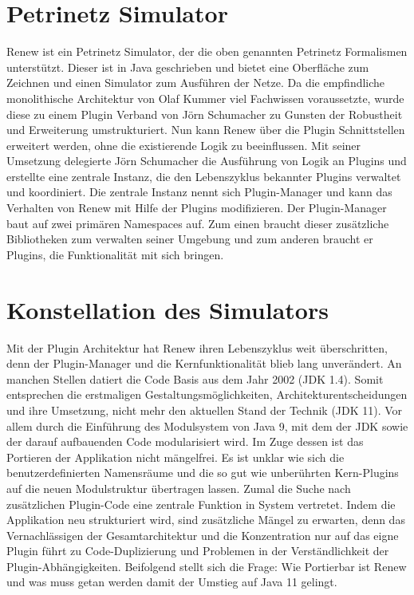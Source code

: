 \section{Petrinetz Simulator} 
Renew ist ein Petrinetz Simulator, der die oben genannten Petrinetz Formalismen unterstützt. 
Dieser ist in Java geschrieben und bietet eine Oberfläche zum Zeichnen und einen Simulator zum Ausführen der Netze.\newline 
Da die empfindliche monolithische Architektur von Olaf Kummer viel Fachwissen voraussetzte, wurde diese zu einem Plugin Verband von Jörn Schumacher zu Gunsten der Robustheit und Erweiterung umstrukturiert. 
Nun kann Renew über die Plugin Schnittstellen erweitert werden, ohne die existierende Logik zu beeinflussen.\bigbreak
Mit seiner Umsetzung delegierte Jörn Schumacher die Ausführung von Logik an Plugins und erstellte eine zentrale Instanz, die den Lebenszyklus bekannter Plugins verwaltet und koordiniert. 
Die zentrale Instanz nennt sich Plugin-Manager und kann das Verhalten von Renew mit Hilfe der Plugins modifizieren.
Der Plugin-Manager baut auf zwei primären Namespaces auf. 
Zum einen braucht dieser zusätzliche Bibliotheken zum verwalten seiner Umgebung und zum anderen braucht er Plugins, die Funktionalität mit sich bringen.

\section{Konstellation des Simulators}
Mit der Plugin Architektur hat Renew ihren Lebenszyklus weit überschritten, denn der Plugin-Manager und die Kernfunktionalität blieb lang unverändert. 
An manchen Stellen datiert die Code Basis aus dem Jahr 2002 (JDK 1.4). 
Somit entsprechen die erstmaligen Gestaltungsmöglichkeiten, Architekturentscheidungen und ihre Umsetzung, nicht mehr den aktuellen Stand der Technik (JDK 11). 
Vor allem durch die Einführung des Modulsystem von Java 9, mit dem der JDK sowie der darauf aufbauenden Code modularisiert wird. 
Im Zuge dessen ist das Portieren der Applikation nicht mängelfrei. 
Es ist unklar wie sich die benutzerdefinierten Namensräume und die so gut wie unberührten Kern-Plugins auf die neuen Modulstruktur übertragen lassen. Zumal die Suche nach zusätzlichen Plugin-Code eine zentrale Funktion in System vertretet.\bigbreak
Indem die Applikation neu strukturiert wird, sind zusätzliche Mängel zu erwarten, denn das Vernachlässigen der Gesamtarchitektur und die Konzentration nur auf das eigne Plugin führt zu Code-Duplizierung und Problemen in der Verständlichkeit der Plugin-Abhängigkeiten.\newline
Beifolgend stellt sich die Frage: Wie Portierbar ist Renew und was muss getan werden damit der Umstieg auf Java 11 gelingt.

